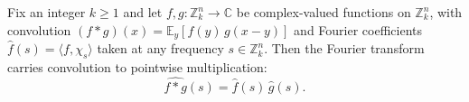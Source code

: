 \begin{lemma}
\label{ZkFourier.fourier_coeff_convolution}
\leanok
{}
Fix an integer $k \ge 1$ and let $f, g : \mathbb{Z}_k^n \to \mathbb{C}$ be
complex-valued functions on $\mathbb{Z}_k^n$, with convolution $(f * g)(x) =
\mathbb{E}_y\!\left[f(y)\,g(x - y)\right]$ and Fourier coefficients $\hat{f}(s) =
\langle f, \chi_s\rangle$ taken at any frequency $s \in \mathbb{Z}_k^n$. Then the
Fourier transform carries convolution to pointwise multiplication:
\[
  \widehat{f * g}(s) = \hat{f}(s)\,\hat{g}(s).
\]
\end{lemma}
